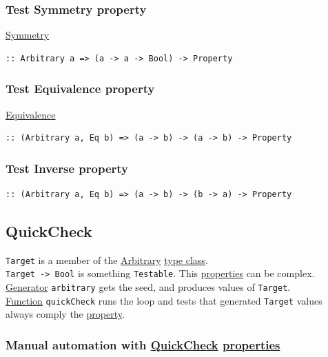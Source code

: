 \documentclass[a4paper,14pt,oneside]{book}
\begin{document}
\subsubsection{\label{orgd88712e}Test Symmetry property}
\label{sec:org032f8b6}
\hyperref[orgf7a29b9]{Symmetry}\\
\begin{verbatim}
:: Arbitrary a => (a -> a -> Bool) -> Property
\end{verbatim}

\subsubsection{\label{org069dd51}Test Equivalence property}
\label{sec:org0361d7f}
\hyperref[org841678d]{Equivalence}\\
\begin{verbatim}
:: (Arbitrary a, Eq b) => (a -> b) -> (a -> b) -> Property
\end{verbatim}

\subsubsection{\label{org6bc99c1}Test Inverse property}
\label{sec:orgc6077f7}
\begin{verbatim}
:: (Arbitrary a, Eq b) => (a -> b) -> (b -> a) -> Property
\end{verbatim}

\subsection{\label{orgdc33d03}QuickCheck}
\label{sec:org13d525a}
\texttt{Target} is a member of the \hyperref[org9414006]{Arbitrary} \hyperref[orgf587b3a]{type class}.\\
\texttt{Target -> Bool} is something \texttt{Testable}. This \hyperref[orgbcfea7d]{properties} can be complex.\\
\hyperref[orgd344dcd]{Generator} \texttt{arbitrary} gets the seed, and produces values of \texttt{Target}.\\
\hyperref[orge00b05b]{Function} \texttt{quickCheck} runs the loop and tests that generated \texttt{Target} values always comply the \hyperref[orgc713167]{property}.\\

\subsubsection{Manual automation with \hyperref[orgdc33d03]{QuickCheck} \hyperref[orgbcfea7d]{properties}}
\label{sec:org9d75075}
\end{document}
